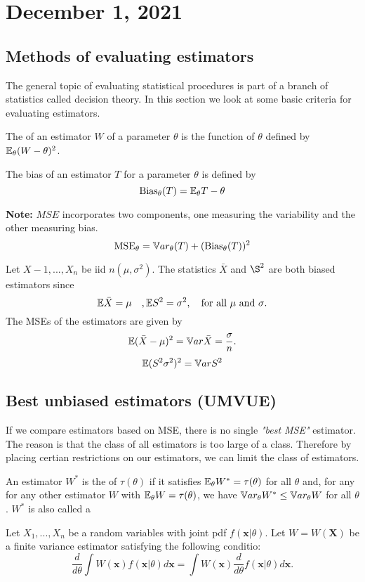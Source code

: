 \section{December 1, 2021}
\subsection{Methods of evaluating estimators}
The general topic of evaluating statistical procedures is part of a branch of statistics called decision theory. In this section we look at some basic criteria for evaluating estimators.
    
\begin{definition}
    The  of an estimator $W$ of a parameter $\theta$ is the function of $\theta$ defined by $\mathbb E_{\theta}(W-\theta)^2$.
\end{definition}

\begin{definition}[Bias]
    The bias of an estimator $T$ for a parameter $\theta$ is defined by 
    $$
    \text{Bias}_{\theta}(T) = \mathbb E_{\theta}T -\theta
    $$
\end{definition}
\textbf{Note:} $MSE$ incorporates two components, one measuring the variability and the other measuring bias.
$$
\text{MSE}_{\theta} = \mathbb V ar_{\theta}(T) + (\text{Bias}_{\theta}(T))^2
$$
\begin{example}
    Let $X-1,...,X_n$ be iid $n(\mu,\sigma^2)$. The statistics $\bar{X}$ and $\S^2$ are both biased estimators since
    $$
    \mathbb E \bar{X} = \mu \quad, \mathbb E S^2 = \sigma^2, \quad \text{for all $\mu$ and $\sigma$}.
    $$
    The MSEs of the estimators are given by
    $$
    \mathbb E(\bar{X} - \mu)^2 = \mathbb V ar \bar{X} = \frac{\sigma}{n}.
    $$
    $$
    \mathbb E(S^2 \sigma^2)^2 = \mathbb V ar S^2
    $$
\end{example}
\subsection{Best unbiased estimators (UMVUE)}
If we compare estimators based on MSE, there is no single \textit{"best MSE"} estimator. The reason is that the class of all estimators is too large of a class. Therefore by placing certian restrictions on our estimators, we can limit the class of estimators.  
\begin{definition}
    An estimator $W^*$ is the  of $\tau(\theta)$ if it satisfies $\mathbb E_{\theta}W^* = \tau(\theta)$ for all $\theta$ and, for any for any other estimator $W$ with $\mathbb E_{\theta}W = \tau(\theta)$, we have $\mathbb V ar_{\theta}W^* \leq \mathbb V ar_{\theta} W$ for all $\theta$. $W^*$ is also called a 
\end{definition}
\begin{theorem}
    Let $X_1,...,X_n$ be a random variables with joint pdf $f(\boldsymbol{x}|\theta)$. Let $W = W(\boldsymbol{X})$ be a finite variance estimator satisfying the following conditio:
    $$
    \frac{d}{d\theta} \int W(\boldsymbol{x})f(\boldsymbol{x}|\theta)d\boldsymbol{x} = 
    \int W(\boldsymbol{x}) \frac{d}{d \theta}f(\boldsymbol{x}|\theta)d \boldsymbol{x}.
    $$
\end{theorem}